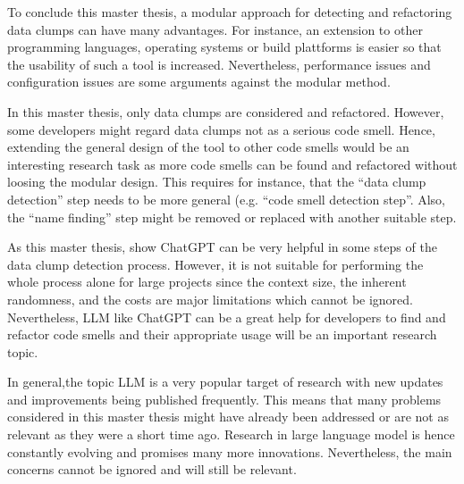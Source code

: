 To conclude this master thesis, a modular approach for detecting and refactoring data clumps can have many advantages.  For instance, an extension to other programming languages, operating systems or build plattforms is easier so that the usability of such a tool is increased. Nevertheless, performance issues and configuration issues are some arguments against the modular method. 

In this master thesis, only data clumps are considered and refactored. However, some developers might regard data clumps not as a serious code smell. Hence, extending the general design of the tool to other code smells would be an interesting research task as more code smells can be found and refactored without loosing the modular design. This requires for instance, that the \enquote{data clump detection} step needs to be more general (e.g. \enquote{code smell detection step}. Also, the \enquote{name finding} step might be removed or replaced with another suitable step. 

As this master thesis, show ChatGPT can be very helpful in some steps of the data clump detection process. However, it is not suitable for performing the whole process alone for large projects since the context size, the inherent randomness, and the costs are major limitations which cannot be ignored. Nevertheless, \ac{LLM} like ChatGPT can be a great help for developers to find and refactor code smells and their appropriate usage will be an important research topic. 

In general,the topic \ac{LLM} is a very popular target of research with new updates and improvements being published frequently. This means that many problems considered in this master thesis might have already been addressed or are not as relevant as they were a short time ago. Research in large language model is hence constantly evolving and promises many more innovations. Nevertheless, the main concerns cannot be ignored and will still be relevant.

